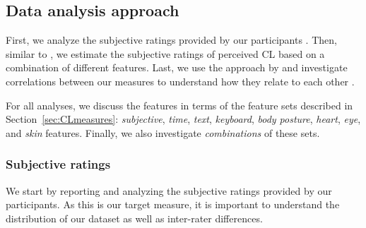 \documentclass[output=paper]{langsci/langscibook}
\begin{document}
\subsection{Data analysis approach}
First, we analyze the subjective ratings provided by our participants%
.
Then, similar to \citet{herbig2019mt}, we estimate the subjective ratings of perceived CL %
based on a combination of different features.
Last, we use the approach by \citet{vieira2016measures} and investigate correlations between our measures %
to understand how they relate to each other%
.

For all analyses, we discuss the features in terms of the feature sets described in Section~\ref{sec:CLmeasures}: \textit{subjective}, \textit{time}, \textit{text}, \textit{keyboard}, \textit{body posture}, \textit{heart}, \textit{eye}, and \textit{skin} features. Finally, we also investigate \textit{combinations} of these sets.

\subsubsection{Subjective ratings}
\label{sec:SubRate}
We start by reporting and analyzing the subjective ratings provided by our participants. As this is our target measure, it is important to understand the distribution of our dataset as well as inter-rater differences.

\end{document}
